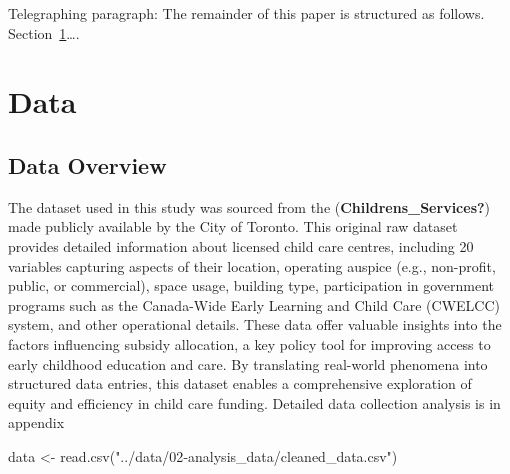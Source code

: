 \documentclass[
  letterpaper,
  DIV=11,
  numbers=noendperiod]{scrartcl}
\newenvironment{Shaded}{\begin{snugshade}}{\end{snugshade}}
\newcommand{\FunctionTok}[1]{\textcolor[rgb]{0.28,0.35,0.67}{#1}}
\newcommand{\NormalTok}[1]{\textcolor[rgb]{0.00,0.23,0.31}{#1}}
\newcommand{\OtherTok}[1]{\textcolor[rgb]{0.00,0.23,0.31}{#1}}
\newcommand{\StringTok}[1]{\textcolor[rgb]{0.13,0.47,0.30}{#1}}
\begin{document}
Telegraphing paragraph: The remainder of this paper is structured as
follows. Section~\ref{sec-data}\ldots.

\section{Data}\label{sec-data}

\subsection{Data Overview}\label{data-overview}

The dataset used in this study was sourced from the
(\textbf{Childrens\_Services?}) made publicly available by the City of
Toronto. This original raw dataset provides detailed information about
licensed child care centres, including 20 variables capturing aspects of
their location, operating auspice (e.g., non-profit, public, or
commercial), space usage, building type, participation in government
programs such as the Canada-Wide Early Learning and Child Care (CWELCC)
system, and other operational details. These data offer valuable
insights into the factors influencing subsidy allocation, a key policy
tool for improving access to early childhood education and care. By
translating real-world phenomena into structured data entries, this
dataset enables a comprehensive exploration of equity and efficiency in
child care funding. Detailed data collection analysis is in appendix

\begin{Shaded}
\begin{Highlighting}[]
\NormalTok{data }\OtherTok{\textless{}{-}} \FunctionTok{read.csv}\NormalTok{(}\StringTok{"../data/02{-}analysis\_data/cleaned\_data.csv"}\NormalTok{)}
\end{Highlighting}
\end{Shaded}
\end{document}

